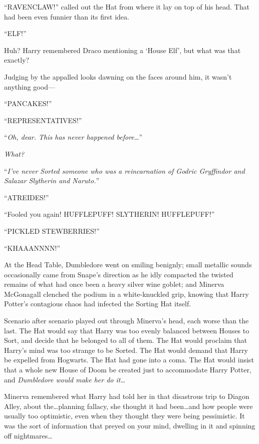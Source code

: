 “RAVENCLAW!” called out the Hat from where it lay on top of his head. That had been even funnier than its first idea.

\later

“ELF!”

Huh? Harry remembered Draco mentioning a ‘House Elf’, but what was that exactly?

Judging by the appalled looks dawning on the faces around him, it wasn’t anything good—

\later

“PANCAKES!”

\later

“REPRESENTATIVES!”

\later

“\emph{Oh, dear. This has never happened before…}”

\emph{What?}

“\emph{I’ve never Sorted someone who was a reincarnation of Godric Gryffindor \emph{and} Salazar Slytherin \emph{and} Naruto.}”

\later

“ATREIDES!”

\later

“Fooled you again! HUFFLEPUFF! SLYTHERIN! HUFFLEPUFF!”

\later

“PICKLED STEWBERRIES!”

\later

“KHAAANNNN!”

\later

At the Head Table, Dumbledore went on smiling benignly; small metallic sounds occasionally came from Snape’s direction as he idly compacted the twisted remains of what had once been a heavy silver wine goblet; and Minerva McGonagall clenched the podium in a white-knuckled grip, knowing that Harry Potter’s contagious chaos had infected the Sorting Hat itself.

Scenario after scenario played out through Minerva’s head, each worse than the last. The Hat would say that Harry was too evenly balanced between Houses to Sort, and decide that he belonged to all of them. The Hat would proclaim that Harry’s mind was too strange to be Sorted. The Hat would demand that Harry be expelled from Hogwarts. The Hat had gone into a coma. The Hat would insist that a whole new House of Doom be created just to accommodate Harry Potter, and \emph{Dumbledore would make her do it…}

Minerva remembered what Harry had told her in that disastrous trip to Diagon Alley, about the…planning fallacy, she thought it had been…and how people were usually too optimistic, even when they thought they were being pessimistic. It was the sort of information that preyed on your mind, dwelling in it and spinning off nightmares…


